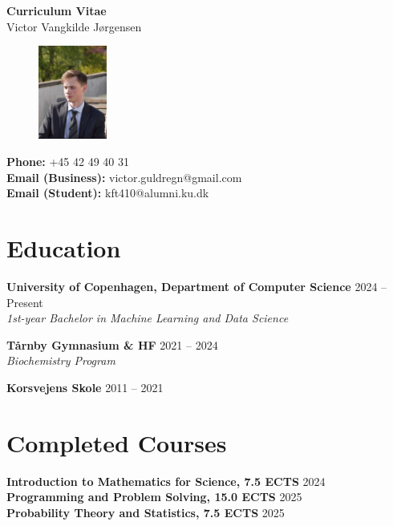 \documentclass[a4paper,10pt]{article}
\makeatletter
\newcommand{\name}{Victor Vangkilde J\o rgensen}
\newcommand{\phone}{+45 42 49 40 31}
\newcommand{\emailBusiness}{victor.guldregn@gmail.com}
\newcommand{\emailStudent}{kft410@alumni.ku.dk}
\makeatother
\begin{document}
\begin{center}
    {\LARGE \textbf{Curriculum Vitae}}\\[1ex]
    {\large \name}
\end{center}

\begin{figure}[h!]
    \centering
    \includegraphics[width=0.2\textwidth, trim={1cm 0 1.5cm 4cm},clip]{profilbillede.jpg}
\end{figure}

\noindent
\textbf{Phone:} \phone \\
\textbf{Email (Business):} \emailBusiness \\
\textbf{Email (Student):} \emailStudent \\

\section*{Education}
\textbf{University of Copenhagen, Department of Computer Science} \hfill 2024 -- Present \\
\textit{1st-year Bachelor in Machine Learning and Data Science}

\textbf{T\aa rnby Gymnasium \& HF} \hfill 2021 -- 2024 \\
\textit{Biochemistry Program}

\textbf{Korsvejens Skole} \hfill 2011 -- 2021 \\

\section*{Completed Courses}
\textbf{Introduction to Mathematics for Science, 7.5 ECTS} \hfill 2024 \\
\textbf{Programming and Problem Solving, 15.0 ECTS} \hfill 2025 \\
\textbf{Probability Theory and Statistics, 7.5 ECTS} \hfill 2025 \\
\end{document}
